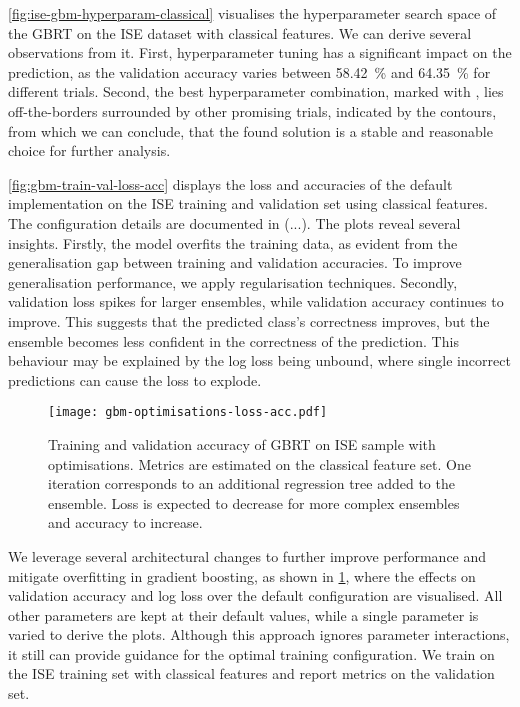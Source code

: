 \cref{fig:ise-gbm-hyperparam-classical} visualises the hyperparameter search space of the \gls{GBRT} on the \gls{ISE} dataset with classical features. We can derive several observations from it. First, hyperparameter tuning has a significant impact on the prediction, as the validation accuracy varies between \SI{58.42}{\percent} and \SI{64.35}{\percent} for different trials. Second, the best hyperparameter combination, marked with \bestcircle, lies off-the-borders surrounded by other promising trials, indicated by the contours, from which we can conclude, that the found solution is a stable and reasonable choice for further analysis.

\cref{fig:gbm-train-val-loss-acc} displays the loss and accuracies of the default implementation on the \gls{ISE} training and validation set using classical features. The configuration details are documented in (...). The plots reveal several insights. Firstly, the model overfits the training data, as evident from the generalisation gap between training and validation accuracies. To improve generalisation performance, we apply regularisation techniques. Secondly, validation loss spikes for larger ensembles, while validation accuracy continues to improve. This suggests that the predicted class's correctness improves, but the ensemble becomes less confident in the correctness of the prediction. This behaviour may be explained by the log loss being unbound, where single incorrect predictions can cause the loss to explode.

\begin{figure}[ht]
    \centering
    \texttt{[image: gbm-optimisations-loss-acc.pdf]}
    \caption[Training and Validation Accuracy of  on  with Optimisations]{Training and validation accuracy of \gls{GBRT} on \gls{ISE} sample with optimisations. Metrics are estimated on the classical feature set. One iteration corresponds to an additional regression tree added to the ensemble. Loss is expected to decrease for more complex ensembles and accuracy to increase.}
    \label{fig:gbm-optimisations-loss-acc}
\end{figure}

We leverage several architectural changes to further improve performance and mitigate overfitting in gradient boosting, as shown in \cref{fig:gbm-optimisations-loss-acc}, where the effects on validation accuracy and log loss over the default configuration are visualised. All other parameters are kept at their default values, while a single parameter is varied to derive the plots. Although this approach ignores parameter interactions, it still can provide guidance for the optimal training configuration. We train on the ISE training set with classical features and report metrics on the validation set.


